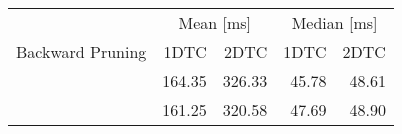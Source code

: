 \begin{tabular}{crrrr}
	\toprule
	                 & \multicolumn{2}{c}{Mean [\si{\milli\second}]} & \multicolumn{2}{c}{Median [\si{\milli\second}]}               \\
	Backward Pruning & 1DTC                                          & 2DTC                                            & 1DTC & 2DTC \\
	\midrule
	\xmark           & 164.35                                             & 326.33                                               & 45.78    & 48.61    \\
	\cmark           & 161.25                                             & 320.58                                               & 47.69    & 48.90    \\
	\bottomrule
\end{tabular}
